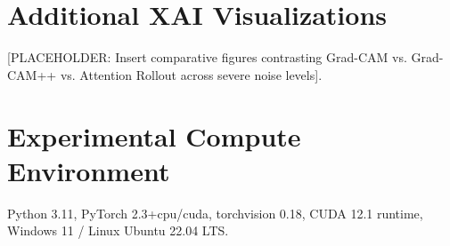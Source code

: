 \documentclass[conference]{IEEEtran}
\begin{document}
\section{Additional XAI Visualizations}
\label{app:xai_visualizations}
[PLACEHOLDER: Insert comparative figures contrasting Grad-CAM vs. Grad-CAM++ vs. Attention Rollout across severe noise levels].

\section{Experimental Compute Environment}
\label{app:compute}
Python 3.11, PyTorch 2.3+cpu/cuda, torchvision 0.18, CUDA 12.1 runtime, Windows 11 / Linux Ubuntu 22.04 LTS.
\end{document}

